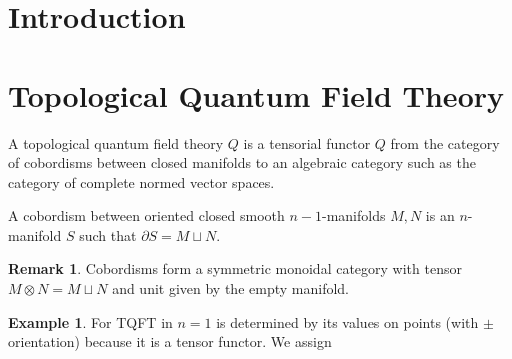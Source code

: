 \documentclass[12pt]{extarticle}
\theoremstyle{definition}
\newtheorem{example}[theorem]{Example}
\newtheorem{remark}{Remark}
\newenvironment{definition}[1][Definition:]{\begin{trivlist}
\item[\hskip \labelsep {\bfseries #1}]}{\end{trivlist}}
\begin{document}
\section{Introduction}

\section{Topological Quantum Field Theory}

\begin{definition}
A topological quantum field theory $Q$ is a tensorial functor $Q$ from the category of cobordisms between closed manifolds to an algebraic category such as the category of complete normed vector spaces. 
\end{definition} 

\begin{definition}
A cobordism between oriented closed smooth $n-1$-manifolds $M, N$ is an $n$-manifold $S$ such that $\partial S = M \sqcup N$.   
\end{definition}

\begin{remark}
Cobordisms form a symmetric monoidal category with tensor $M \otimes N = M \sqcup N$ and unit given by the empty manifold.
\end{remark}

\begin{example}
For TQFT in $n = 1$ is determined by its values on points (with $\pm$ orientation) because it is a tensor functor. We assign
\end{example}

\newcommand{\Cob}{\mathbf{Cob}}
\renewcommand{\Vec}{\mathbf{Vec}}
\end{document}
